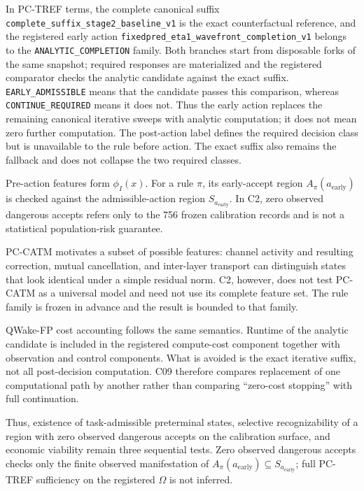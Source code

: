 In PC-TREF terms, the complete canonical suffix
\nolinkurl{complete_suffix_stage2_baseline_v1} is the exact counterfactual reference,
and the registered early action
\nolinkurl{fixedpred_eta1_wavefront_completion_v1} belongs to the
\texttt{ANALYTIC\_COMPLETION} family. Both branches start from disposable forks of
the same snapshot; required responses are materialized and the registered comparator
checks the analytic candidate against the exact suffix. \texttt{EARLY\_ADMISSIBLE}
means that the candidate passes this comparison, whereas
\texttt{CONTINUE\_REQUIRED} means it does not. Thus the early action replaces the
remaining canonical iterative sweeps with analytic computation; it does not mean zero
further computation. The post-action label defines the required decision class but is
unavailable to the rule before action. The exact suffix also remains the fallback and
does not collapse the two required classes.

Pre-action features form \(\phi_I(x)\). For a rule \(\pi\), its early-accept region
\(A_{\pi}(a_{\mathrm{early}})\) is checked against the admissible-action region
\(S_{a_{\mathrm{early}}}\). In C2, zero observed dangerous accepts refers only to
the 756 frozen calibration records and is not a statistical population-risk guarantee.

PC-CATM motivates a subset of possible features: channel activity and resulting
correction, mutual cancellation, and inter-layer transport can distinguish states that
look identical under a simple residual norm. C2, however, does not test PC-CATM as a
universal model and need not use its complete feature set. The rule family is frozen
in advance and the result is bounded to that family.

QWake-FP cost accounting follows the same semantics. Runtime of the analytic candidate
is included in the registered compute-cost component together with observation and
control components. What is avoided is the exact iterative suffix, not all
post-decision computation. C09 therefore compares replacement of one computational
path by another rather than comparing ``zero-cost stopping'' with full continuation.

Thus, existence of task-admissible preterminal states, selective recognizability of a
region with zero observed dangerous accepts on the calibration surface, and economic
viability remain three sequential tests. Zero observed dangerous accepts checks only
the finite observed manifestation of
\(A_{\pi}(a_{\mathrm{early}})\subseteq S_{a_{\mathrm{early}}}\); full PC-TREF
sufficiency on the registered \(\Omega\) is not inferred.

